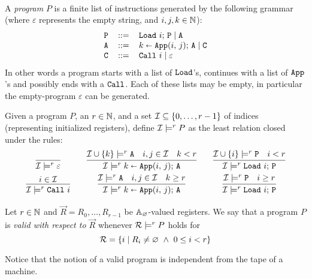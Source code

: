 \begin{defi}\label{def:progs}\
\bsub
\item\label{def:progs1}
	A \emph{program} $P$ is a finite list of instructions generated by the following grammar (where $\varepsilon$ represents the empty string, and $i,j,k\in\nat$):
	\[
	\begin{array}{lcl}
	\ins{P}&\eqbnf&\Load i;\, \ins{P}\mid \ins{A}\\
	\ins{A}&\eqbnf&\Apply ijk;\, \ins{A}\mid \ins{C}\\
	\ins{C}&\eqbnf&\Call i \mid \varepsilon
	\end{array}
	\]
	In other words a program starts with a list of $\ins{Load}$'s, continues with a list of $\ins{App}$'s and possibly ends with a $\ins{Call}$. Each of these lists may be empty, in particular the empty-program $\varepsilon$ can be generated.
\item\label{def:progs2}
	Given a program $P$, an $r\in\nat$, and a set $\cI\subseteq \set{0,\dots,r-1}$ of indices (representing initialized registers), define $\cI\models^{r} P$ as the least relation closed under the rules:
\[
	\begin{array}{ccccc}
		\infer{\cI\models^{r}\varepsilon}{}
		&&
		\infer{\cI\models^{r} \Apply ijk;\, \ins{A}}{\cI\cup\set{k}\models^{r}  \ins{A} & i,j\in \cI & k<r}
		&&
		\infer{\cI\models^{r} \Load i;\, \ins{P}}{\cI\cup\set{i}\models^{r}  \ins{P} & i< r}
		\\[3pt]
		\infer{\cI\models^{r}\Call i}{i\in \cI}&&
		\infer{\cI\models^{r} \Apply ijk;\, \ins{A}}{\cI\models^{r}  \ins{A} & i,j\in \cI & k\ge r}
		&&
		\infer{\cI\models^{r} \Load i;\, \ins{P}}{\cI\models^{r}  \ins{P} & i \ge r}
	\end{array}
\]
\item Let $r\in\nat$ and $\vec R = R_0,\dots,R_{r-1}$ be $\Addrs_\Null$-valued registers.
	We say that a program $P$ is \emph{valid with respect to $\vec R$} whenever $\cR\models^{r} P$ holds for
	\begin{equation}\label{eq:R}
		\cR = \set {i\st R_i \neq\Null \und 0\le i < r}
	\end{equation}
\esub
\end{defi}

\noindent
Notice that the notion of a valid program is independent from the tape of a machine.

